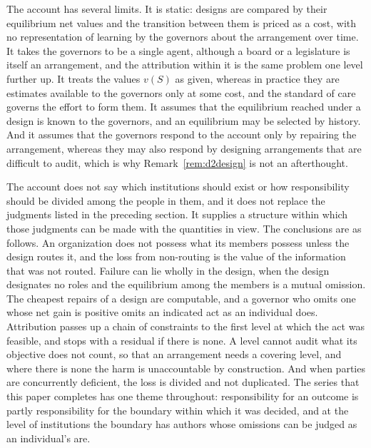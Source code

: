\documentclass[11pt]{article}
\theoremstyle{plain}
\theoremstyle{definition}
\begin{document}
The account has several limits. It is static: designs are compared by their equilibrium net values and the transition between them is priced as a cost, with no representation of learning by the governors about the arrangement over time. It takes the governors to be a single agent, although a board or a legislature is itself an arrangement, and the attribution within it is the same problem one level further up. It treats the values $v(S)$ as given, whereas in practice they are estimates available to the governors only at some cost, and the standard of care governs the effort to form them. It assumes that the equilibrium reached under a design is known to the governors, and an equilibrium may be selected by history. And it assumes that the governors respond to the account only by repairing the arrangement, whereas they may also respond by designing arrangements that are difficult to audit, which is why Remark~\ref{rem:d2design} is not an afterthought.

The account does not say which institutions should exist or how responsibility should be divided among the people in them, and it does not replace the judgments listed in the preceding section. It supplies a structure within which those judgments can be made with the quantities in view. The conclusions are as follows. An organization does not possess what its members possess unless the design routes it, and the loss from non-routing is the value of the information that was not routed. Failure can lie wholly in the design, when the design designates no roles and the equilibrium among the members is a mutual omission. The cheapest repairs of a design are computable, and a governor who omits one whose net gain is positive omits an indicated act as an individual does. Attribution passes up a chain of constraints to the first level at which the act was feasible, and stops with a residual if there is none. A level cannot audit what its objective does not count, so that an arrangement needs a covering level, and where there is none the harm is unaccountable by construction. And when parties are concurrently deficient, the loss is divided and not duplicated. The series that this paper completes has one theme throughout: responsibility for an outcome is partly responsibility for the boundary within which it was decided, and at the level of institutions the boundary has authors whose omissions can be judged as an individual's are.
\end{document}
